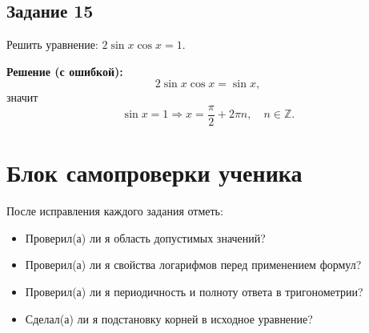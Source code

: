 \documentclass[12pt,a4paper]{article}
\begin{document}
\subsection*{Задание 15}
Решить уравнение: $2\sin x\cos x=1$.

\textbf{Решение (с ошибкой):}
\[
2\sin x\cos x=\sin x,
\]
значит
\[
\sin x=1 \Rightarrow x=\frac{\pi}{2}+2\pi n,\quad n\in\mathbb Z.
\]

\section*{Блок самопроверки ученика}
После исправления каждого задания отметь:
\begin{itemize}
    \item Проверил(а) ли я область допустимых значений?
    \item Проверил(а) ли я свойства логарифмов перед применением формул?
    \item Проверил(а) ли я периодичность и полноту ответа в тригонометрии?
    \item Сделал(а) ли я подстановку корней в исходное уравнение?
\end{itemize}
\end{document}
